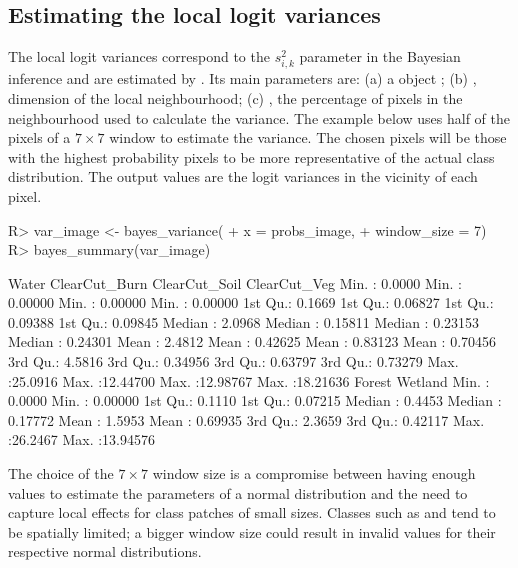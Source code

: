 \documentclass[
  shortnames]{jss}
\begin{document}
\newpage

\hypertarget{estimating-the-local-logit-variances}{%
\subsection{Estimating the local logit variances}\label{estimating-the-local-logit-variances}}

The local logit variances correspond to the \(s^2_{i,k}\) parameter in the Bayesian inference and are estimated by . Its main parameters are: (a) a  object ; (b) , dimension of the local neighbourhood; (c) , the percentage of pixels in the neighbourhood used to calculate the variance. The example below uses half of the pixels of a \(7\times 7\) window to estimate the variance. The chosen pixels will be those with the highest probability pixels to be more representative of the actual class distribution. The output values are the logit variances in the vicinity of each pixel.

\begin{CodeChunk}
\begin{CodeInput}
R> var_image <- bayes_variance(
+     x = probs_image,
+     window_size = 7)
R> bayes_summary(var_image)
\end{CodeInput}
\begin{CodeOutput}
 Water             ClearCut_Burn      ClearCut_Soil      ClearCut_Veg      
 Min.   : 0.0000   Min.   : 0.00000   Min.   : 0.00000   Min.   : 0.00000  
 1st Qu.: 0.1669   1st Qu.: 0.06827   1st Qu.: 0.09388   1st Qu.: 0.09845  
 Median : 2.0968   Median : 0.15811   Median : 0.23153   Median : 0.24301  
 Mean   : 2.4812   Mean   : 0.42625   Mean   : 0.83123   Mean   : 0.70456  
 3rd Qu.: 4.5816   3rd Qu.: 0.34956   3rd Qu.: 0.63797   3rd Qu.: 0.73279  
 Max.   :25.0916   Max.   :12.44700   Max.   :12.98767   Max.   :18.21636  
 Forest            Wetland           
 Min.   : 0.0000   Min.   : 0.00000  
 1st Qu.: 0.1110   1st Qu.: 0.07215  
 Median : 0.4453   Median : 0.17772  
 Mean   : 1.5953   Mean   : 0.69935  
 3rd Qu.: 2.3659   3rd Qu.: 0.42117  
 Max.   :26.2467   Max.   :13.94576  
\end{CodeOutput}
\end{CodeChunk}

The choice of the \(7 \times 7\) window size is a compromise between having enough values to
estimate the parameters of a normal distribution and the need to capture local effects
for class patches of small sizes. Classes such as  and 
tend to be spatially limited; a bigger window size could result in invalid values for
their respective normal distributions.
\end{document}
